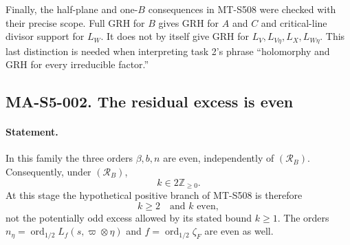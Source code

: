 Finally, the half-plane and one-$B$ consequences in MT-S508 were
checked with their precise scope. Full GRH for $B$ gives GRH for
$A$ and $C$ and critical-line divisor support for $L_W$. It does
not by itself give GRH for $L_V,L_{V\eta},L_X,L_{W\eta}$.
This last distinction is needed when interpreting task 2's
phrase ``holomorphy and GRH for every irreducible factor.''

\subsection*{MA-S5-002. The residual excess is even}

\paragraph{Statement.}
In this family the three orders $\beta,b,n$ are even, independently
of $(\mathcal R_B)$. Consequently, under $(\mathcal R_B)$,
\[
        k\in 2\mathbb Z_{\ge0}.
\]
At this stage the hypothetical positive branch of MT-S508 is therefore
\[
             k\ge2\quad\text{and }k\text{ even},
 \tag{MA-S5.4}
\]
not the potentially odd excess allowed by its stated bound $k\ge1$.
The orders $n_\eta=\operatorname{ord}_{1/2}L_f(s,\varpi\otimes\eta)$
and $f=\operatorname{ord}_{1/2}\zeta_F$ are even as well.

